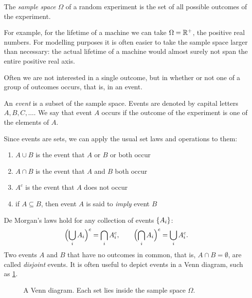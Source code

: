 \begin{definition}\label{def:sample-space}
The \emph{sample space} $\Omega$ of a random experiment is the set of all possible outcomes of the experiment.
\end{definition}

For example, for the lifetime of a machine we can take $\Omega = \mathbb{R}^{+}$, the positive real numbers. For modelling purposes it is often easier to take the sample space larger than necessary: the actual lifetime of a machine would almost surely not span the entire positive real axis.

Often we are not interested in a single outcome, but in whether or not one of a group of outcomes occurs, that is, in an event.

\begin{definition}[Event]\label{def:event}
An \emph{event} is a subset of the sample space. Events are denoted by capital letters $A, B, C, \ldots$. We say that event $A$ occurs if the outcome of the experiment is one of the elements of $A$.
\end{definition}

Since events are sets, we can apply the usual set laws and operations to them:
\begin{enumerate}
  \item $A \cup B$ is the event that $A$ or $B$ or both occur
  \item $A \cap B$ is the event that $A$ and $B$ both occur
  \item $A^c$ is the event that $A$ does not occur
  \item if $A \subseteq B$, then event $A$ is said to \emph{imply} event $B$
\end{enumerate}
De Morgan's laws hold for any collection of events $\left\{ A_i \right\}$:
\[
  \Bigl(\bigcup_i A_i\Bigr)^c = \bigcap_i A_i^c, \qquad \Bigl(\bigcap_i A_i\Bigr)^c = \bigcup_i A_i^c.
\]
Two events $A$ and $B$ that have no outcomes in common, that is, $A \cap B = \emptyset$, are called \emph{disjoint} events. It is often useful to depict events in a Venn diagram, such as \cref{fig:venn-diagram}.

\begin{figure}[H]
\centering
{}
\caption{A Venn diagram. Each set lies inside the sample space $\Omega$.}
\label{fig:venn-diagram}
\end{figure}

